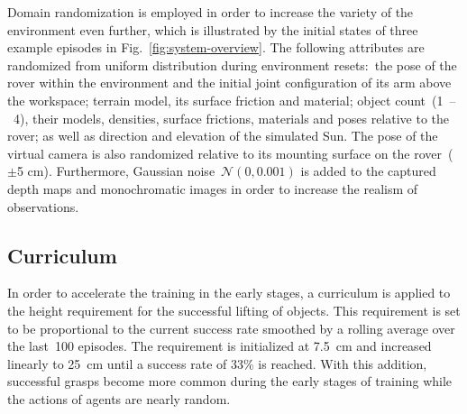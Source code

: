 Domain randomization is employed in order to increase the variety of the environment even further, which is illustrated by the initial states of three example episodes in Fig.~\ref{fig:system-overview}. The following attributes are randomized from uniform distribution during environment resets:~the pose of the rover within the environment and the initial joint configuration of its arm above the workspace; terrain model, its surface friction and material; object count~(1~--~4), their models, densities, surface frictions, materials and poses relative to the rover; as well as direction and elevation of the simulated Sun. The pose of the virtual camera is also randomized relative to its mounting surface on the rover~(\(\pm\)5 cm). Furthermore, Gaussian noise~\mbox{\(\mathcal{N}(0, 0.001)\)} is added to the captured depth maps and monochromatic images in order to increase the realism of observations.

\subsection{Curriculum}\label{ssec:curriculum}

In order to accelerate the training in the early stages, a curriculum is applied to the height requirement for the successful lifting of objects. This requirement is set to be proportional to the current success rate smoothed by a rolling average over the last~100 episodes. The requirement is initialized at 7.5~cm and increased linearly to 25~cm until a success rate of 33\% is reached. With this addition, successful grasps become more common during the early stages of training while the actions of agents are nearly random.
